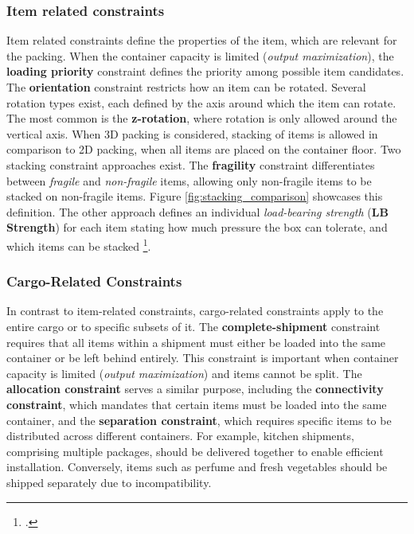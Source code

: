 \subsubsection{Item related constraints}
Item related constraints define the properties of the item, which are relevant
for the packing. When the container capacity is limited (\textit{output maximization}),
the \textbf{loading priority} constraint defines the priority among possible
item candidates. The \textbf{orientation} constraint restricts how an item can be rotated.
Several rotation types exist, each defined by the axis around which the item can rotate.
The most common is the \textbf{z-rotation}, where rotation is only allowed around the vertical axis.
When 3D packing is considered, stacking of items is allowed in comparison to 2D packing, when all
items are placed on the container floor. Two stacking constraint approaches exist.
The \textbf{fragility} constraint differentiates between \textit{fragile} and \textit{non-fragile} items,
allowing only non-fragile items to be stacked on non-fragile items. Figure \ref{fig:stacking_comparison} showcases
this definition. The other approach defines an individual \textit{load-bearing strength} (\textbf{LB Strength}) for each
item stating how much pressure the box can tolerate, and which items can be stacked \footcite[cf.][pp. 847--848]{krebs_advanced_2021}.



\subsubsection{Cargo-Related Constraints}
In contrast to item-related constraints, cargo-related constraints apply to
the entire cargo or to specific subsets of it. The \textbf{complete-shipment} constraint
requires that all items within a shipment must either be loaded into the same
container or be left behind entirely. This constraint is important
when container capacity is limited (\textit{output maximization}) and items
cannot be split. The \textbf{allocation constraint} serves a similar purpose,
including the \textbf{connectivity constraint}, which mandates that
certain items must be loaded into the same container, and the
\textbf{separation constraint}, which requires specific items to
be distributed across different containers. For example, kitchen
shipments, comprising multiple packages, should be delivered together
to enable efficient installation. Conversely, items such as perfume and fresh
vegetables should be shipped separately due to incompatibility.

